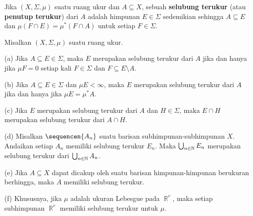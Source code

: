  Jika $(X,\Sigma,\mu)$
suatu ruang ukur dan $A\subseteq X$, sebuah {\bf selubung terukur} (atau
{\bf penutup terukur}) dari $A$ adalah himpunan $E\in\Sigma$ sedemikian
sehingga $A\subseteq E$ dan $\mu(F\cap E)=\mu^*(F\cap A)$ untuk setiap
$F\in\Sigma$. 

 Misalkan $(X,\Sigma,\mu)$ suatu ruang ukur.

(a) Jika $A\subseteq E\in\Sigma$, maka $E$ merupakan selubung terukur dari
$A$ jika dan hanya jika $\mu F=0$ setiap kali $F\in\Sigma$ dan
$F\subseteq E\setminus A$.

(b) Jika $A\subseteq E\in\Sigma$ dan $\mu E<\infty$, maka $E$ merupakan
selubung terukur dari $A$ jika dan hanya jika $\mu E=\mu^*A$.

(c) Jika $E$ merupakan selubung terukur dari $A$ dan $H\in\Sigma$, maka
$E\cap H$ merupakan selubung terukur dari $A\cap H$.

(d) Misalkan $\sequencen{A_n}$ suatu barisan subhimpunan-subhimpunan $X$.
Andaikan setiap $A_n$ memiliki selubung terukur $E_n$. Maka
$\bigcup_{n\in\Bbb N}E_n$ merupakan selubung terukur dari
$\bigcup_{n\in\Bbb N}A_n$.

(e) Jika $A\subseteq X$ dapat dicakup oleh suatu barisan himpunan-himpunan
berukuran berhingga, maka $A$ memiliki selubung terukur.

(f) Khususnya, jika $\mu$ adalah ukuran Lebesgue pada $\BbbR^r$, maka setiap
subhimpunan $\BbbR^r$ memiliki selubung terukur untuk $\mu$.

